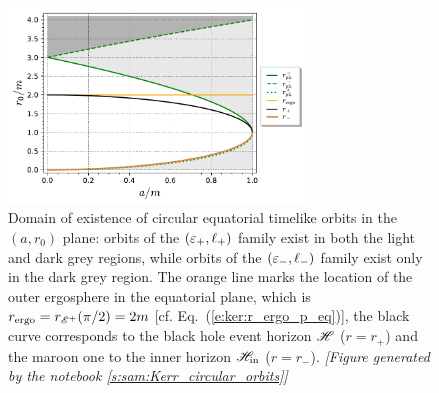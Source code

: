 \begin{figure}
\centerline{\includegraphics[width=0.7\textwidth]{gek_circ_orb_lim.pdf}}
\caption[]{\label{f:gek:circ_orb_lim} \footnotesize
Domain of existence of circular equatorial timelike orbits in the $(a, r_0)$ plane:
orbits of the $(\varepsilon_+,\ell_+)$ family exist in both the light and dark grey regions,
while orbits of the $(\varepsilon_-,\ell_-)$ family exist only in the dark grey region.
The orange line marks
the location of the outer ergosphere in the equatorial plane, which is
$r_{\rm ergo} = r_{\mathscr{E}^+}(\pi/2) = 2m$ [cf. Eq.~(\ref{e:ker:r_ergo_p_eq})],
the black curve corresponds to the black hole event horizon $\mathscr{H}$
($r=r_+$) and the maroon one to the inner horizon
$\mathscr{H}_{\rm in}$ ($r=r_-$).
\textsl{[Figure generated by the notebook \ref{s:sam:Kerr_circular_orbits}]}
}
\end{figure}



